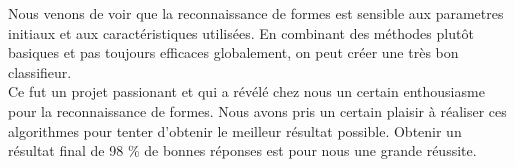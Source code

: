 Nous venons de voir que la reconnaissance de formes est sensible 
aux parametres initiaux et aux caractéristiques utilisées. En combinant
des méthodes plutôt basiques et pas toujours efficaces globalement, 
on peut créer une très bon classifieur. \\
Ce fut un projet passionant et qui a révélé chez nous un certain 
enthousiasme pour la reconnaissance de formes. Nous avons pris un 
certain plaisir à réaliser ces algorithmes pour tenter d'obtenir
le meilleur résultat possible. Obtenir un résultat final de 98 \%
de bonnes réponses est pour nous une grande réussite.